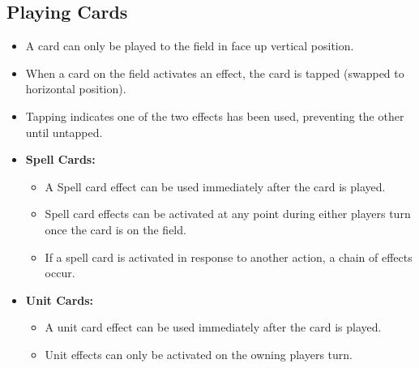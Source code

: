 \subsection{Playing Cards}
\begin{itemize}
    \item A card can only be played to the field in face up vertical position.
    \item When a card on the field activates an effect, the card is tapped (swapped to horizontal position).
    \item Tapping indicates one of the two effects has been used, preventing the other until untapped.
    \item \textbf{Spell Cards:}
    \begin{itemize}
        \item A Spell card effect can be used immediately after the card is played.
        \item Spell card effects can be activated at any point during either players turn once the card is on the field.
        \item If a spell card is activated in response to another action, a chain of effects occur.
    \end{itemize}
    \item \textbf{Unit Cards:}
    \begin{itemize}
        \item A unit card effect can be used immediately after the card is played.
        \item Unit effects can only be activated on the owning players turn.
    \end{itemize}
\end{itemize}






